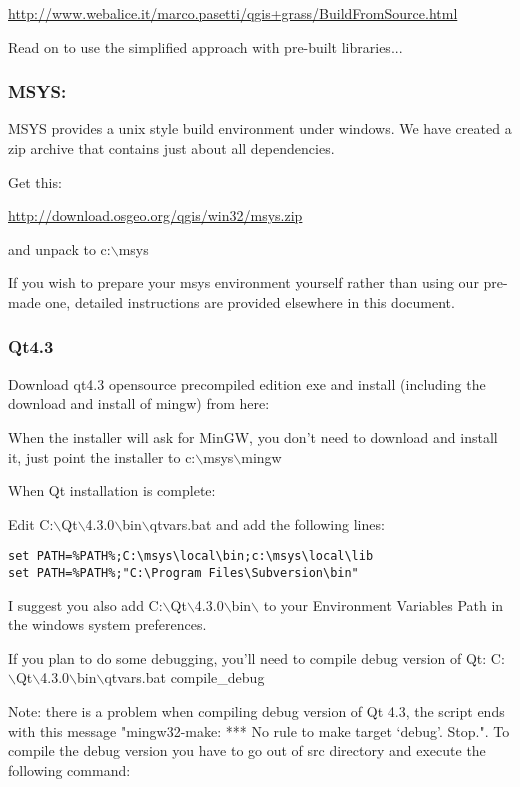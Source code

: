 \url{http://www.webalice.it/marco.pasetti/qgis+grass/BuildFromSource.html}

Read on to use the simplified approach with pre-built libraries...

\hypertarget{toc5}{}
\subsubsection{MSYS:}
MSYS provides a unix style build environment under windows. We have created a
zip archive that contains just about all dependencies.

Get this: 

\url{http://download.osgeo.org/qgis/win32/msys.zip}

and unpack to c:$\backslash$msys

If you wish to prepare your msys environment yourself rather than using 
our pre-made one, detailed instructions are provided elsewhere in this
document.

\hypertarget{toc6}{}
\subsubsection{Qt4.3}
Download qt4.3 opensource precompiled edition exe and install (including the
download and install of mingw) from here:


When the installer will ask for MinGW, you don't need to download and install
it, just point the installer to c:$\backslash$msys$\backslash$mingw

When Qt installation is complete:

Edit C:$\backslash$Qt$\backslash$4.3.0$\backslash$bin$\backslash$qtvars.bat and add the following lines:

\begin{verbatim}
set PATH=%PATH%;C:\msys\local\bin;c:\msys\local\lib 
set PATH=%PATH%;"C:\Program Files\Subversion\bin" 
\end{verbatim}

I suggest you also add C:$\backslash$Qt$\backslash$4.3.0$\backslash$bin$\backslash$ to your Environment Variables Path in
the windows system preferences.

If you plan to do some debugging, you'll need to compile debug version of Qt:
C:$\backslash$Qt$\backslash$4.3.0$\backslash$bin$\backslash$qtvars.bat compile\_debug

Note: there is a problem when compiling debug version of Qt 4.3, the script ends with
this message  "mingw32-make: *** No rule to make target `debug'.  Stop.". To 
compile the debug version you have to go out of src directory and execute the
following command:

